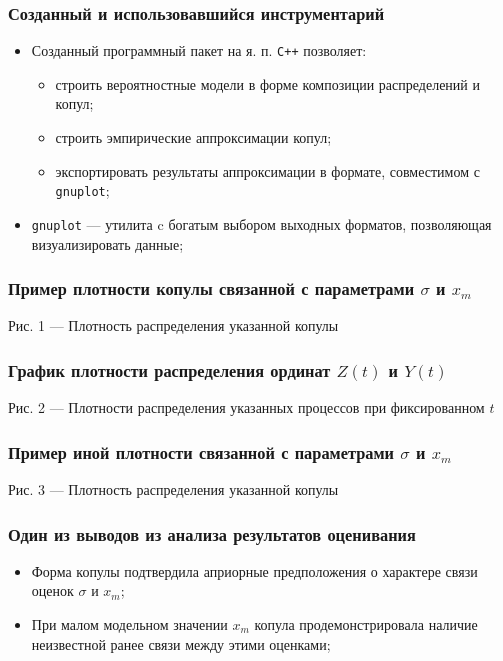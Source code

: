\documentclass[11pt]{beamer}
\begin{document}
\begin{frame}
\begin{center}
\frametitle{Созданный и использовавшийся инструментарий}
\begin{itemize}
  \item Созданный программный пакет на я. п. \texttt{C++} позволяет:
    \begin{itemize}
      \item строить вероятностные модели в форме композиции распределений и копул;
      \item строить эмпирические аппроксимации копул;
      \item экспортировать результаты аппроксимации в формате, совместимом с \texttt{gnuplot};
    \end{itemize}
  \item \texttt{gnuplot} --- утилита c богатым выбором выходных форматов, позволяющая визуализировать данные;
\end{itemize}
\end{center}
\end{frame}

\begin{frame}
\begin{center}
\frametitle{Пример плотности копулы связанной с параметрами $\sigma$ и $x_m$}
\resizebox{\columnwidth}{!}{}
{\small Рис. 1 --- Плотность распределения указанной копулы}
\end{center}
\end{frame}

\begin{frame}
\begin{center}
\frametitle{График плотности распределения ординат $Z(t)$ и $Y(t)$}
{\small Рис. 2 --- Плотности распределения указанных процессов при фиксированном $t$}
\resizebox{\columnwidth}{!}{}
\end{center}
\end{frame}

\begin{frame}
\begin{center}
\frametitle{Пример иной плотности связанной с параметрами $\sigma$ и $x_m$}
\resizebox{\columnwidth}{!}{}
{\small Рис. 3 --- Плотность распределения указанной копулы}
\end{center}
\end{frame}

\begin{frame}
\begin{center}
\frametitle{Один из выводов из анализа результатов оценивания}
\begin{itemize}
  \item Форма копулы подтвердила априорные предположения о характере связи оценок $\sigma$ и $x_m$;
  \item При малом модельном значении $x_m$ копула продемонстрировала наличие неизвестной ранее связи между этими оценками;
\end{itemize}
\end{center}
\end{frame}
\end{document}

